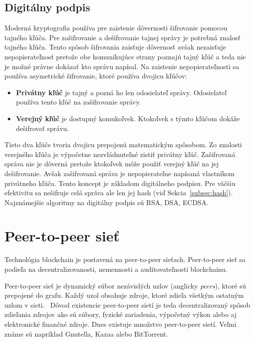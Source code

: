 \subsection{Digitálny podpis}\label{subsec:sign}
Moderná kryptografia používa pre zaistenie dôvernosti šifrovanie pomocou tajného kľúča. Pre zašifrovanie a dešifrovanie tajnej správy je potrebná znalosť tajného kľúča. Tento spôsob šifrovania zaisťuje dôvernosť avšak nezaisťuje nepopierateľnosť pretože obe komunikujúce strany poznajú tajný kľúč a teda nie je možné právne dokázať kto správu napísal. Na zaistenie nepopierateľnosti sa používa asymetrické šifrovanie, ktoré používa dvojicu kľúčov:
\begin{itemize}
	\item \textbf{Privátny kľúč} je tajný a pozná ho len odosielateľ správy. Odosielateľ používa tento kľúč na zašifrovanie správy.
	\item \textbf{Verejný kľúč} je dostupný komukoľvek. Ktokoľvek s týmto kľúčom dokáže dešifrovať správu.
\end{itemize}
Tieto dva kľúče tvoria dvojicu prepojenú matematickým spôsobom. Zo znalosti verejného kľúča je výpočetne nezvládnuteľné zistiť privátny kľúč. Zašifrovaná správa nie je dôverná pretože ktokoľvek môže použiť verejný kľúč na jej dešifrovanie. Avšak zašifrovaná správa je nepopierateľne napísaná vlastníkom privátneho kľúča. Tento koncept je základom digitálneho podpisu. Pre väčšiu efektivitu sa nešifruje celá správa ale len jej hash (viď Sekcia~\ref{subsec:hash}). Najznámejšie algoritmy na digitálny podpis sú RSA, DSA, ECDSA.~\cite{cryptoHandbook}


\section{Peer-to-peer sieť}\label{sec:p2p}

Technológia blockchain je postavená na peer-to-peer sieťach. Peer-to-peer sieť sa podieľa na decentralizovanosti, nemennosti a auditovateľnosti blockchainu. 

Peer-to-peer sieť je dynamický súbor nezávislých uzlov (anglicky \textit{peers}), ktoré sú prepojené do grafu. Každý uzol obsahuje zdroje, ktoré zdieľa všetkým ostatným uzlom v sieti.~\cite{p2pBuford, p2pSchollmeier} Dôvod existencie peer-to-peer sietí je teda decentralizovaný spôsob zdieľania zdrojov ako sú súbory, fyzické zariadenia, výpočetný výkon alebo aj elektronické finančné zdroje. Dnes existuje množstvo peer-to-peer sietí. Veľmi známe sú napríklad Gnutella, Kazaa alebo BitTorrent.~\cite{p2pEssence}

